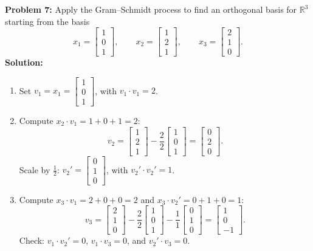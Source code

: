 \documentclass[11pt, letterpaper]{article}
\theoremstyle{definition}
\theoremstyle{remark}
\begin{document}
\textbf{Problem 7:} Apply the Gram--Schmidt process to find an orthogonal basis for $\mathbb{R}^3$ starting from the basis
\[
    x_1 = \begin{bmatrix} 1 \\ 0 \\ 1 \end{bmatrix}, \qquad x_2 = \begin{bmatrix} 1 \\ 2 \\ 1 \end{bmatrix}, \qquad x_3 = \begin{bmatrix} 2 \\ 1 \\ 0 \end{bmatrix}.
\]
\textbf{Solution:}
\begin{enumerate}[label=\textbf{Step \arabic*:}]
    \item Set $v_1 = x_1 = \begin{bmatrix} 1 \\ 0 \\ 1 \end{bmatrix}$, with $v_1 \cdot v_1 = 2$.
    \item Compute $x_2 \cdot v_1 = 1 + 0 + 1 = 2$:
    \[
        v_2 = \begin{bmatrix} 1 \\ 2 \\ 1 \end{bmatrix} - \frac{2}{2}\begin{bmatrix} 1 \\ 0 \\ 1 \end{bmatrix} = \begin{bmatrix} 0 \\ 2 \\ 0 \end{bmatrix}.
    \]
    Scale by $\frac{1}{2}$: $v_2' = \begin{bmatrix} 0 \\ 1 \\ 0 \end{bmatrix}$, with $v_2' \cdot v_2' = 1$.
    \item Compute $x_3 \cdot v_1 = 2 + 0 + 0 = 2$ and $x_3 \cdot v_2' = 0 + 1 + 0 = 1$:
    \[
        v_3 = \begin{bmatrix} 2 \\ 1 \\ 0 \end{bmatrix} - \frac{2}{2}\begin{bmatrix} 1 \\ 0 \\ 1 \end{bmatrix} - \frac{1}{1}\begin{bmatrix} 0 \\ 1 \\ 0 \end{bmatrix} = \begin{bmatrix} 1 \\ 0 \\ -1 \end{bmatrix}.
    \]
    Check: $v_1 \cdot v_2' = 0$, $v_1 \cdot v_3 = 0$, and $v_2' \cdot v_3 = 0$.
\end{enumerate}
\end{document}
